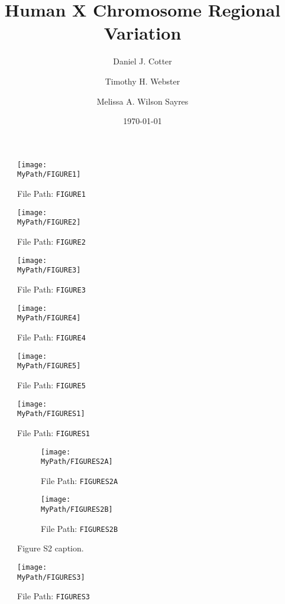 \documentclass[12pt]{article}
\title{Human X Chromosome Regional Variation}
\author[1]{Daniel J. Cotter}
\author[1]{Timothy H. Webster}
\author[1]{Melissa A. Wilson Sayres}
\affil[1]{Arizona State University}
\date{\today}
\newcommand*{\MyPath}{..}
\newcommand{\beginsupplement}{%
        \setcounter{table}{0}
        \renewcommand{\thetable}{S\arabic{table}}%
        \setcounter{figure}{0}
        \renewcommand{\thefigure}{S\arabic{figure}}%
     }
\begin{document}
\maketitle

\begin{abstract}

\end{abstract}

\begin{figure}
  \texttt{[image: \\MyPath/FIGURE1]}
  \caption{File Path: \texttt{FIGURE1}}
  \label{fig:fig1}
\end{figure}

\begin{figure}
  \texttt{[image: \\MyPath/FIGURE2]}
  \caption{File Path: \texttt{FIGURE2}}
  \label{fig:fig2}
\end{figure}

\begin{figure}
  \texttt{[image: \\MyPath/FIGURE3]}
  \caption{File Path: \texttt{FIGURE3}}
  \label{fig:fig3}
\end{figure}

\begin{figure}
  \texttt{[image: \\MyPath/FIGURE4]}
  \caption{File Path: \texttt{FIGURE4}}
  \label{fig:fig4}
\end{figure}

\begin{figure}
  \texttt{[image: \\MyPath/FIGURE5]}
  \caption{File Path: \texttt{FIGURE5}}
  \label{fig:fig5}
\end{figure}

\beginsupplement

\begin{figure}
  \texttt{[image: \\MyPath/FIGURES1]}
  \caption{File Path: \texttt{FIGURES1}}
  \label{fig:figS1}
\end{figure}

\begin{figure}[h!]
  \centering
  \begin{subfigure}[b]{0.4\linewidth}
    \texttt{[image: \\MyPath/FIGURES2A]}
    \caption{File Path: \texttt{FIGURES2A}}
  \end{subfigure}
  \begin{subfigure}[b]{0.4\linewidth}
    \texttt{[image: \\MyPath/FIGURES2B]}
    \caption{File Path: \texttt{FIGURES2B}}
  \end{subfigure}
  \caption{Figure S2 caption.}
  \label{fig:figS2}
\end{figure}

\begin{figure}
  \texttt{[image: \\MyPath/FIGURES3]}
  \caption{File Path: \texttt{FIGURES3}}
  \label{fig:figS3}
\end{figure}
\end{document}
